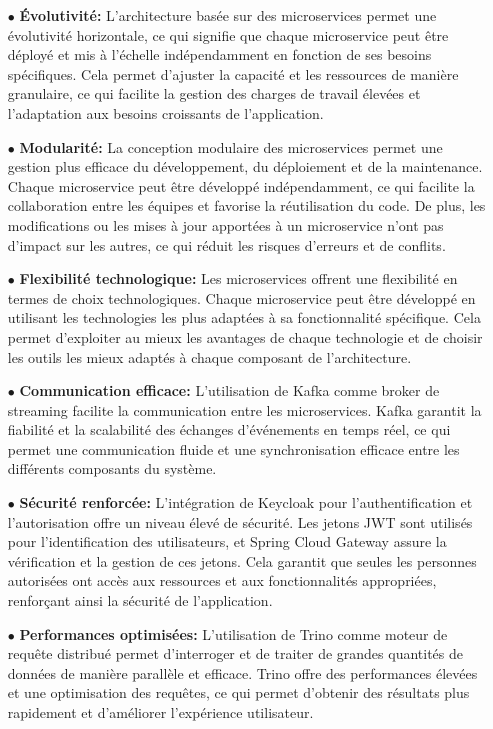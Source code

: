 \begin{enumerate}
    \item[$\bullet$] \textbf{Évolutivité:} L'architecture basée sur des microservices permet une évolutivité horizontale, ce qui signifie que chaque microservice peut être déployé et mis à l'échelle indépendamment en fonction de ses besoins spécifiques. Cela permet d'ajuster la capacité et les ressources de manière granulaire, ce qui facilite la gestion des charges de travail élevées et l'adaptation aux besoins croissants de l'application.
    \item[$\bullet$] \textbf{Modularité:} La conception modulaire des microservices permet une gestion plus efficace du développement, du déploiement et de la maintenance. Chaque microservice peut être développé indépendamment, ce qui facilite la collaboration entre les équipes et favorise la réutilisation du code. De plus, les modifications ou les mises à jour apportées à un microservice n'ont pas d'impact sur les autres, ce qui réduit les risques d'erreurs et de conflits. 
    \item[$\bullet$] \textbf{Flexibilité technologique:} Les microservices offrent une flexibilité en termes de choix technologiques. Chaque microservice peut être développé en utilisant les technologies les plus adaptées à sa fonctionnalité spécifique. Cela permet d'exploiter au mieux les avantages de chaque technologie et de choisir les outils les mieux adaptés à chaque composant de l'architecture. 
    \item[$\bullet$] \textbf{Communication efficace:} L'utilisation de Kafka comme broker de streaming facilite la communication entre les microservices. Kafka garantit la fiabilité et la scalabilité des échanges d'événements en temps réel, ce qui permet une communication fluide et une synchronisation efficace entre les différents composants du système. 
    \item[$\bullet$] \textbf{Sécurité renforcée:} L'intégration de Keycloak pour l'authentification et l'autorisation offre un niveau élevé de sécurité. Les jetons JWT sont utilisés pour l'identification des utilisateurs, et Spring Cloud Gateway assure la vérification et la gestion de ces jetons. Cela garantit que seules les personnes autorisées ont accès aux ressources et aux fonctionnalités appropriées, renforçant ainsi la sécurité de l'application.
    \item[$\bullet$] \textbf{Performances optimisées:}  L'utilisation de Trino comme moteur de requête distribué permet d'interroger et de traiter de grandes quantités de données de manière parallèle et efficace. Trino offre des performances élevées et une optimisation des requêtes, ce qui permet d'obtenir des résultats plus rapidement et d'améliorer l'expérience utilisateur. 
\end{enumerate}


